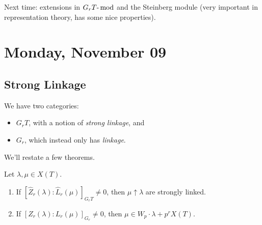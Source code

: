 Next time: extensions in \({{G_r T}{\hbox{-}}\operatorname{mod}}\) and
the Steinberg module (very important in representation theory, has some
nice properties).

\hypertarget{monday-november-09}{%
\section{Monday, November 09}\label{monday-november-09}}

\hypertarget{strong-linkage-2}{%
\subsection{Strong Linkage}\label{strong-linkage-2}}

We have two categories:

\begin{itemize}
\tightlist
\item
  \(G_r T\), with a notion of \emph{strong linkage}, and
\item
  \(G_r\), which instead only has \emph{linkage}.
\end{itemize}

We'll restate a few theorems.

\begin{theorem}[?]

\envlist

Let \(\lambda, \mu \in X(T)\).

\begin{enumerate}
\def\labelenumi{\arabic{enumi}.}
\item
  If \([\widehat{Z}_r(\lambda) : \widehat{L}_r(\mu) ]_{G_r T} \neq 0\),
  then \(\mu \uparrow \lambda\) are strongly linked.
\item
  If \([{Z}_r(\lambda) : {L}_r(\mu) ]_{G_r} \neq 0\), then
  \(\mu \in W_p \cdot\lambda + p^r X(T)\).
\end{enumerate}

\end{theorem}

